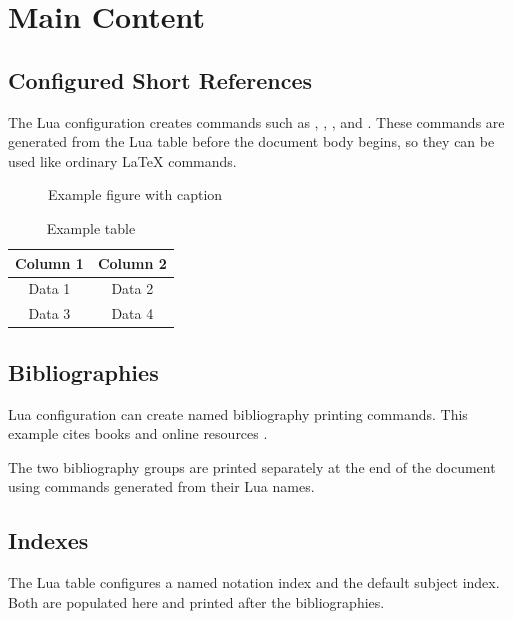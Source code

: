 \documentclass{article}
\begin{document}
\section{Main Content}

\subsection{Configured Short References}

The Lua configuration creates commands such as ,
, , and .
These commands are generated from the Lua table before the document body begins,
so they can be used like ordinary LaTeX commands.

\begin{figure}[htbp]
  \centering
  \caption{Example figure with caption}
  \label{fig:sample}
\end{figure}

\begin{table}[htbp]
  \centering
  \begin{tabular}{|c|c|}
    \hline
    Column 1 & Column 2 \\
    \hline
    Data 1 & Data 2 \\
    Data 3 & Data 4 \\
    \hline
  \end{tabular}
  \caption{Example table}
  \label{tab:sample}
\end{table}

\subsection{Bibliographies}

Lua configuration can create named bibliography printing commands. This example
cites books \cite{knuth1984texbook,lamport1994latex} and online resources
\cite{torvalds2003git,ctan2024latex}.

The two bibliography groups are printed separately at the end of the document
using commands generated from their Lua names.

\subsection{Indexes}

The Lua table configures a named notation index and the default subject index.
Both are populated here and printed after the bibliographies.
\end{document}
